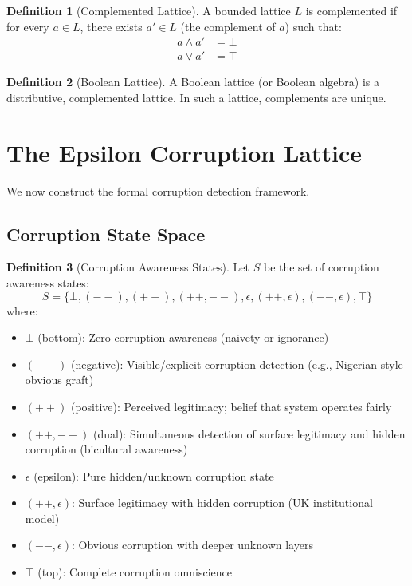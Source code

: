 \documentclass[11pt,a4paper]{article}
\theoremstyle{definition}
\newtheorem{definition}{Definition}
\begin{document}
\begin{definition}[Complemented Lattice]
A bounded lattice $L$ is complemented if for every $a \in L$, there exists $a' \in L$ (the complement of $a$) such that:
\begin{align}
a \wedge a' &= \bot \\
a \vee a' &= \top
\end{align}
\end{definition}

\begin{definition}[Boolean Lattice]
A Boolean lattice (or Boolean algebra) is a distributive, complemented lattice. In such a lattice, complements are unique.
\end{definition}

\section{The Epsilon Corruption Lattice}

We now construct the formal corruption detection framework.

\subsection{Corruption State Space}

\begin{definition}[Corruption Awareness States]
Let $S$ be the set of corruption awareness states:
\[
S = \{\bot, (--), (++), (++,--), \epsilon, (++,\epsilon), (--,\epsilon), \top\}
\]
where:
\begin{itemize}
    \item $\bot$ (bottom): Zero corruption awareness (naivety or ignorance)
    \item $(--)$ (negative): Visible/explicit corruption detection (e.g., Nigerian-style obvious graft)
    \item $(++)$ (positive): Perceived legitimacy; belief that system operates fairly
    \item $(++,--)$ (dual): Simultaneous detection of surface legitimacy and hidden corruption (bicultural awareness)
    \item $\epsilon$ (epsilon): Pure hidden/unknown corruption state
    \item $(++,\epsilon)$: Surface legitimacy with hidden corruption (UK institutional model)
    \item $(--,\epsilon)$: Obvious corruption with deeper unknown layers
    \item $\top$ (top): Complete corruption omniscience
\end{itemize}
\end{definition}
\end{document}
